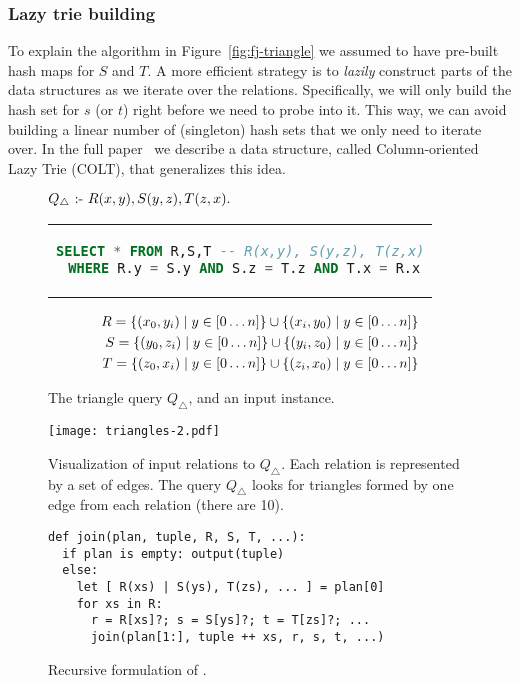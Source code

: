 \subsubsection{Lazy trie building}
To explain the algorithm in Figure~\ref{fig:fj-triangle} we assumed
to have pre-built hash maps for $S$ and $T$.
A more efficient strategy is to {\em lazily} construct parts of the data structures
as we iterate over the relations.
Specifically, we will only build the hash set for $s$ (or $t$)
right before we need to probe into it.
This way, we can avoid building a linear number of (singleton) hash sets
that we only need to iterate over.
In the full paper~\cite{10.1145/3589295} we describe a data structure,
called Column-oriented Lazy Trie (COLT), that generalizes this idea.

\begin{figure}
  $Q_\triangle \text{ :- } R(x, y), S(y, z), T(z, x).$
  \begin{center}
    \begin{tabular}{c}
      \begin{lstlisting}[language=SQL, numbers=none]
SELECT * FROM R,S,T -- R(x,y), S(y,z), T(z,x)
 WHERE R.y = S.y AND S.z = T.z AND T.x = R.x
\end{lstlisting}
    \end{tabular}
  \end{center}
  \begin{align*}
    R  = \{{(x_0, y_i)}\mid{y \in [0 \ldots n]}\} \cup \{{(x_i, y_0)}\mid{y \in [0 \ldots n]}\} \\
    S  = \{{(y_0, z_i)}\mid{y \in [0 \ldots n]}\} \cup \{{(y_i, z_0)}\mid{y \in [0 \ldots n]}\} \\
    T  = \{{(z_0, x_i)}\mid{y \in [0 \ldots n]}\} \cup \{{(z_i, x_0)}\mid{y \in [0 \ldots n]}\}
  \end{align*}
  \caption{The triangle query $Q_\triangle$, and an input instance.}
  \label{fig:triangle-query}
\end{figure}

\begin{figure}
  \texttt{[image: triangles-2.pdf]}
  \caption{Visualization of input relations to $Q_\triangle$.
    Each relation is represented by a set of edges.
    The query $Q_\triangle$ looks for triangles formed by
    one edge from each relation (there are 10).}
\end{figure}

\begin{figure}
  \begin{lstlisting}
def join(plan, tuple, R, S, T, ...):
  if plan is empty: output(tuple)
  else:
    let [ R(xs) | S(ys), T(zs), ... ] = plan[0]
    for xs in R:
      r = R[xs]?; s = S[ys]?; t = T[zs]?; ...
      join(plan[1:], tuple ++ xs, r, s, t, ...)
\end{lstlisting}
  \caption{Recursive formulation of \FJ.}
  \label{fig:fj-recursive}
\end{figure}


